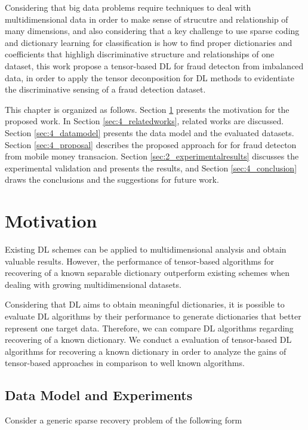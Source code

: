 Considering that big data problems require techniques to deal with multidimensional data in order to make sense of strucutre and relationship of many dimensions, and also considering that a key challenge to use sparse coding and dictionary learning for classification is how to find proper dictionaries and coefficients that highligh discriminative structure and relationships of one dataset, this work propose a tensor-based DL for fraud detecton from imbalanced data, in order to apply the tensor deconposition for DL methods to evidentiate the discriminative sensing of a fraud detection dataset. 

This chapter is organized as follows. Section \ref{sec:4_motivation} presents the motivation for the proposed work. In Section \ref{sec:4_relatedworks}, related works are discussed. Section \ref{sec:4_datamodel} presents the data model and the evaluated datasets. Section \ref{sec:4_proposal} describes the proposed approach for for fraud detecton from mobile money transacion. Section \ref{sec:2_experimentalresults} discusses the experimental validation and presents the results, and Section \ref{sec:4_conclusion} draws the conclusions and the suggestions for future work.


\section{Motivation}
\label{sec:4_motivation}

Existing DL schemes can be applied to multidimensional analysis and obtain valuable results. However, the performance of tensor-based algorithms for recovering of a known separable dictionary outperform existing schemes when dealing with growing multidimensional datasets.

Considering that DL aims to obtain meaningful dictionaries, it is possible to evaluate DL algorithms by their performance to generate dictionaries that better represent one target data. Therefore, we can compare DL algorithms regarding recovering of a known dictionary. We conduct a evaluation of tensor-based DL algorithms for recovering a known dictionary in order to analyze the gains of tensor-based approaches in comparison to well known algorithms.

\subsection{Data Model and Experiments}
\label{sec:4_motivation_datamodel}

Consider a generic sparse recovery problem of the following form

